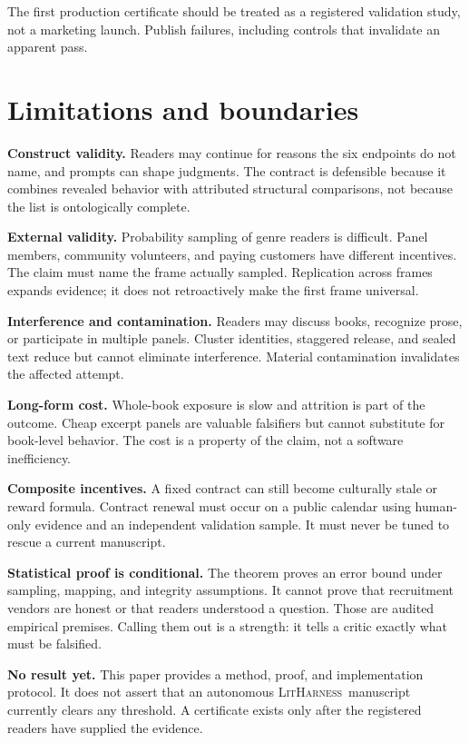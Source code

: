 \documentclass[11pt]{article}
\theoremstyle{remark}
\newcommand{\system}{\textsc{LitHarness}}
\begin{document}
The first production certificate should be treated as a registered validation study, not a
marketing launch. Publish failures, including controls that invalidate an apparent pass.

\section{Limitations and boundaries}

\textbf{Construct validity.} Readers may continue for reasons the six endpoints do not name,
and prompts can shape judgments. The contract is defensible because it combines revealed
behavior with attributed structural comparisons, not because the list is ontologically
complete.

\textbf{External validity.} Probability sampling of genre readers is difficult. Panel
members, community volunteers, and paying customers have different incentives. The claim
must name the frame actually sampled. Replication across frames expands evidence; it does not
retroactively make the first frame universal.

\textbf{Interference and contamination.} Readers may discuss books, recognize prose, or
participate in multiple panels. Cluster identities, staggered release, and sealed text reduce
but cannot eliminate interference. Material contamination invalidates the affected attempt.

\textbf{Long-form cost.} Whole-book exposure is slow and attrition is part of the outcome.
Cheap excerpt panels are valuable falsifiers but cannot substitute for book-level behavior.
The cost is a property of the claim, not a software inefficiency.

\textbf{Composite incentives.} A fixed contract can still become culturally stale or reward
formula. Contract renewal must occur on a public calendar using human-only evidence and an
independent validation sample. It must never be tuned to rescue a current manuscript.

\textbf{Statistical proof is conditional.} The theorem proves an error bound under sampling,
mapping, and integrity assumptions. It cannot prove that recruitment vendors are honest or
that readers understood a question. Those are audited empirical premises. Calling them out
is a strength: it tells a critic exactly what must be falsified.

\textbf{No result yet.} This paper provides a method, proof, and implementation protocol. It
does not assert that an autonomous \system\ manuscript currently clears any threshold. A
certificate exists only after the registered readers have supplied the evidence.
\end{document}
